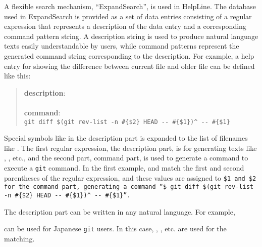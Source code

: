 \documentclass[manuscript,anonymous,review]{acmart}
\def\HL{\textsf{HelpLine}}
\def\GIT{\texttt{git}}
\def\ES{\textsf{ExpandSearch}}
\begin{document}
A flexible search mechanism, ``{\ES}'', is used in {\HL}.
%
The database used in {\ES} is provided as a set of data entries
consisting of a regular expression that represents a description of the data entry
and a corresponding command pattern string.
A description string is used to produce natural language texts
easily understandable by users,
while command patterns represent the generated command string
corresponding to the description.
%
For example, a help entry for showing the difference between
current file and older file can be defined like this:

\begin{quote}
  \textbf{description}: \\
  \\
  \textbf{command}: \\
  {\smallfont\verb|git diff $(git rev-list -n #{$2} HEAD -- #{$1})^ -- #{$1}|}
\end{quote}

Special symbols like  in the description part is expanded to
the list of filenames like .
The first regular expression, the description part,
is for generating texts like
, 
, etc.,
and the second part, command part,
is used to generate a command to execute a {\GIT} command.
In the first example,  and 
match the first and second parentheses of the regular expression, and
these values are assigned to \tt{\$1} and \tt{\$2}
for the command part, generating a command
``{\smallfont\verb|$ git diff $(git rev-list -n #{$2} HEAD -- #{$1})^|}
{\smallfont\verb|-- #{$1}|}''.

The description part can be written in any natural language.
For example,

\begin{quote}
\end{quote}
can be used for Japanese {\GIT} users.
In this case,
,
, etc.
are used for the matching.
\end{document}
